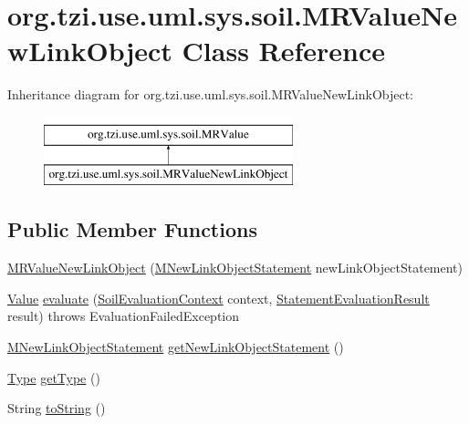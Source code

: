 \hypertarget{classorg_1_1tzi_1_1use_1_1uml_1_1sys_1_1soil_1_1_m_r_value_new_link_object}{\section{org.\-tzi.\-use.\-uml.\-sys.\-soil.\-M\-R\-Value\-New\-Link\-Object Class Reference}
\label{classorg_1_1tzi_1_1use_1_1uml_1_1sys_1_1soil_1_1_m_r_value_new_link_object}
}
Inheritance diagram for org.\-tzi.\-use.\-uml.\-sys.\-soil.\-M\-R\-Value\-New\-Link\-Object\-:\begin{figure}[H]
\begin{center}
\leavevmode
\includegraphics[height=2.000000cm]{classorg_1_1tzi_1_1use_1_1uml_1_1sys_1_1soil_1_1_m_r_value_new_link_object}
\end{center}
\end{figure}
\subsection*{Public Member Functions}
\begin{DoxyCompactItemize}
\item 
\hyperlink{classorg_1_1tzi_1_1use_1_1uml_1_1sys_1_1soil_1_1_m_r_value_new_link_object_a166ed55c070622c84e18ff983af945ba}{M\-R\-Value\-New\-Link\-Object} (\hyperlink{classorg_1_1tzi_1_1use_1_1uml_1_1sys_1_1soil_1_1_m_new_link_object_statement}{M\-New\-Link\-Object\-Statement} new\-Link\-Object\-Statement)
\item 
\hyperlink{classorg_1_1tzi_1_1use_1_1uml_1_1ocl_1_1value_1_1_value}{Value} \hyperlink{classorg_1_1tzi_1_1use_1_1uml_1_1sys_1_1soil_1_1_m_r_value_new_link_object_abdc174f2894500403016d6bf5909ba9f}{evaluate} (\hyperlink{classorg_1_1tzi_1_1use_1_1uml_1_1sys_1_1soil_1_1_soil_evaluation_context}{Soil\-Evaluation\-Context} context, \hyperlink{classorg_1_1tzi_1_1use_1_1uml_1_1sys_1_1_statement_evaluation_result}{Statement\-Evaluation\-Result} result)  throws Evaluation\-Failed\-Exception 
\item 
\hyperlink{classorg_1_1tzi_1_1use_1_1uml_1_1sys_1_1soil_1_1_m_new_link_object_statement}{M\-New\-Link\-Object\-Statement} \hyperlink{classorg_1_1tzi_1_1use_1_1uml_1_1sys_1_1soil_1_1_m_r_value_new_link_object_a40f8348e59d264fdb76bcc2903c7f785}{get\-New\-Link\-Object\-Statement} ()
\item 
\hyperlink{interfaceorg_1_1tzi_1_1use_1_1uml_1_1ocl_1_1type_1_1_type}{Type} \hyperlink{classorg_1_1tzi_1_1use_1_1uml_1_1sys_1_1soil_1_1_m_r_value_new_link_object_a9ac0c883bc89eda9fe71d96781352ed9}{get\-Type} ()
\item 
String \hyperlink{classorg_1_1tzi_1_1use_1_1uml_1_1sys_1_1soil_1_1_m_r_value_new_link_object_af91bb2c7a61022fcda361ba13e1376a0}{to\-String} ()
\end{DoxyCompactItemize}


